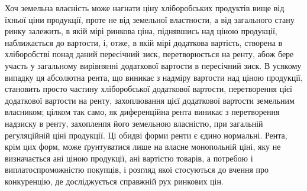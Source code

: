 Хоч земельна власність може нагнати ціну хліборобських продуктів вище
від їхньої ціни продукції, проте не від земельної властности, а від загального стану
ринку залежить, в якій мірі ринкова ціна, піднявшись над ціною продукції, наближається
до вартости, і, отже, в якій мірі додаткова вартість, створена в хліборобстві
понад даний пересічний зиск, перетворюється на ренту, абож бере участь у загальному
вирівнянні додаткової вартости в пересічний зиск. В усякому випадку
ця абсолютна рента, що виникає з надміру вартости над ціною продукції, становить
просто частину хліборобської додаткової вартости, перетворення цієї додаткової
вартости на ренту, захоплювання цієї додаткової вартости земельним власником;
цілком так само, як диференційна рента виникає з перетворення надзиску в ренту, захопленпя його
земельною власністю, при загальній регуляційній ціні продукції. Ці обидві форми ренти є єдино
нормальні. Рента, крім цих форм, може ґрунтуватися лише на власне монопольній ціні, яку не
визначається ані ціною продукції, ані вартістю товарів, а потребою і виплатоспроможністю покупців, і
розгляд якої стосуються до вчення про конкуренцію, де досліджується справжній рух ринкових цін.
